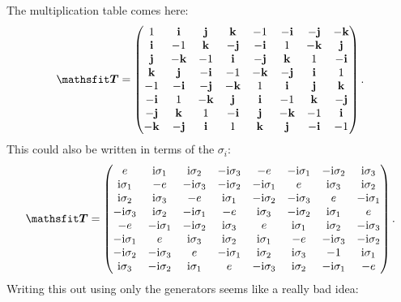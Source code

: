 \documentclass[11pt, english, fleqn, DIV=15, headinclude, BCOR=1cm]{scrartcl}
\begin{document}
The multiplication table comes here:
\[
    \tens T =
    \begin{pmatrix}
         1   &  \qi &  \qj &  \qk & -1   & -\qi & -\qj & -\qk \\
         \qi & -1   &  \qk & -\qj & -\qi &  1   & -\qk &  \qj \\
         \qj & -\qk & -1   &  \qi & -\qj &  \qk &  1   & -\qi \\
         \qk &  \qj & -\qi & -1   & -\qk & -\qj &  \qi &  1   \\
        -1   & -\qi & -\qj & -\qk &  1   &  \qi &  \qj &  \qk \\
        -\qi &  1   & -\qk &  \qj &  \qi & -1   &  \qk & -\qj \\
        -\qj &  \qk &  1   & -\qi &  \qj & -\qk & -1   &  \qi \\
        -\qk & -\qj &  \qi &  1   &  \qk &  \qj & -\qi & -1  
    \end{pmatrix}.
\]
This could also be written in terms of the $\sigma_i$:
\[
    \tens T =
    \begin{pmatrix}
         e   &  \iup\1 &  \iup\2 &  -\iup\3 & -e   & -\iup\1 & -\iup\2 & \iup\3 \\
         \iup\1 & -e   &  -\iup\3 & -\iup\2 & -\iup\1 &  e   & \iup\3 &  \iup\2 \\
         \iup\2 & \iup\3 & -e   &  \iup\1 & -\iup\2 &  -\iup\3 &  e   & -\iup\1 \\
         -\iup\3 &  \iup\2 & -\iup\1 & -e   & \iup\3 & -\iup\2 &  \iup\1 &  e   \\
        -e   & -\iup\1 & -\iup\2 & \iup\3 &  e   &  \iup\1 &  \iup\2 &  -\iup\3 \\
        -\iup\1 &  e   & \iup\3 &  \iup\2 &  \iup\1 & -e   &  -\iup\3 & -\iup\2 \\
        -\iup\2 &  -\iup\3 &  e   & -\iup\1 &  \iup\2 & \iup\3 & -1   &  \iup\1 \\
        \iup\3 & -\iup\2 &  \iup\1 &  e   &  -\iup\3 &  \iup\2 & -\iup\1 & -e  
    \end{pmatrix}.
\]
Writing this out using only the generators seems like a really bad idea:
\end{document}
